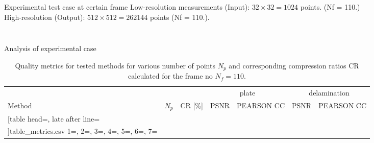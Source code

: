 \documentclass[10pt,aspectratio=169,dvipsnames]{beamer} %
\begin{document}
		\begin{frame}{Experimental test case at certain frame}
			Low-resolution measurements (Input): \(32\times32=1024\) points. (Nf = 110.)\\
			High-resolution (Output): \(512\times512=262144\) points (Nf = 110.).
			\begin{columns}[T]
				\begin{column}[c]{0.19\textwidth}
					\begin{figure}						
					\end{figure}
				\end{column}
				\begin{column}[c]{0.8\textwidth}
					\begin{figure}[ht!]
						\quad
						\quad
						\quad
						\quad
						\quad
						
						\quad
						\quad
						\quad
						\quad
						\quad
					\end{figure}
				\end{column}				
			\end{columns}
		\end{frame}

		\begin{frame}{Analysis of experimental case}
			\begin{table}[!ht]
				\renewcommand{\arraystretch}{1.3}
				\centering \footnotesize
				\caption{Quality metrics for tested methods for various number of points $N_p$ and corresponding compression ratios CR calculated for the frame no $N_f=110$.}	
				\begin{tabular}{lrrrcrc} 
					\toprule
					& & & \multicolumn{2}{c}{plate} & \multicolumn{2}{c}{delamination} \\
					\cmidrule(lr){4-5} \cmidrule(lr){6-7}
					Method & $N_p$ & CR [\%] & PSNR & PEARSON CC& PSNR & PEARSON CC \\
					\midrule
					\csvreader
					[table head=\toprule,
					late after line=\\ 
					]{table_metrics.csv}{
						1=\one, 2=\two, 3=\three, 4=\four, 5=\five, 6=\six, 7=\seven
					}%
					{\one & \two & \three & \four & \five & \six & \seven }%
					\bottomrule
				\end{tabular}	
				\label{tab:csv_results}
			\end{table}
		\end{frame}
\end{document}

